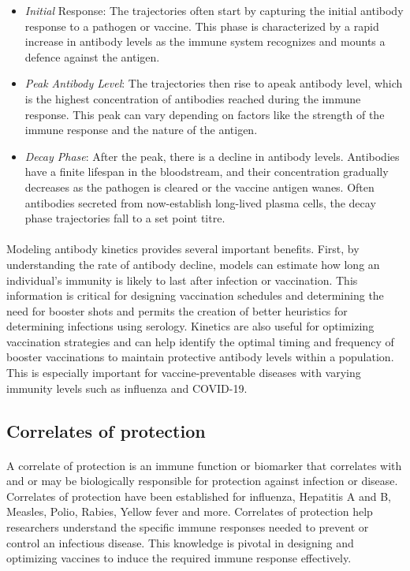 \documentclass{article}
\begin{document}
\begin{itemize}
\item \textit{Initial} Response: The trajectories often start by capturing the initial antibody response to a pathogen or vaccine. This phase is characterized by a rapid increase in antibody levels as the immune system recognizes and mounts a defence against the antigen.

\item \textit{Peak Antibody Level}: The trajectories then rise to apeak antibody level, which is the highest concentration of antibodies reached during the immune response. This peak can vary depending on factors like the strength of the immune response and the nature of the antigen.

\item \textit{Decay Phase}: After the peak, there is a decline in antibody levels. Antibodies have a finite lifespan in the bloodstream, and their concentration gradually decreases as the pathogen is cleared or the vaccine antigen wanes. Often antibodies secreted from now-establish long-lived plasma cells, the decay phase trajectories fall to a set point titre.\cite{srivasta}
\end{itemize}


\paragraph{}Modeling antibody kinetics provides several important benefits. First, by understanding the rate of antibody decline, models can estimate how long an individual's immunity is likely to last after infection or vaccination. This information is critical for designing vaccination schedules and determining the need for booster shots and permits the creation of better heuristics for determining infections using serology. Kinetics are also useful for optimizing vaccination strategies and can help identify the optimal timing and frequency of booster vaccinations to maintain protective antibody levels within a population. This is especially important for vaccine-preventable diseases with varying immunity levels such as influenza and COVID-19.

\subsection{Correlates of protection}
\paragraph{} A correlate of protection is an immune function or biomarker that correlates with and or may be biologically responsible for protection against infection or disease. Correlates of protection have been established for influenza, Hepatitis A and B, Measles, Polio, Rabies, Yellow fever and more.\cite{Plotkin} Correlates of protection help researchers understand the specific immune responses needed to prevent or control an infectious disease. This knowledge is pivotal in designing and optimizing vaccines to induce the required immune response effectively.\cite{}
\end{document}
